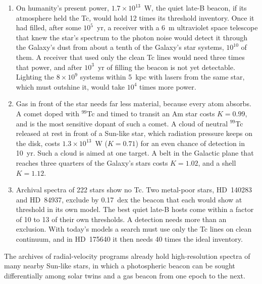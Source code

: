 \documentclass[final,5p]{elsarticle}
\begin{document}
\begin{enumerate}
\item On humanity's present power, $1.7\times10^{13}$~W, the quiet late-B beacon, if its atmosphere held the Tc, would hold 12 times its threshold inventory. Once it had filled, after some $10^{5}$~yr, a receiver with a 6~m ultraviolet space telescope that knew the star's spectrum to the photon noise would detect it through the Galaxy's dust from about a tenth of the Galaxy's star systems, $10^{10}$ of them. A receiver that used only the clean Tc lines would need three times that power, and after $10^{3}$~yr of filling the beacon is not yet detectable. Lighting the $8\times10^{9}$ systems within 5~kpc with lasers from the same star, which must outshine it, would take $10^{4}$ times more power.
\item Gas in front of the star needs far less material, because every atom absorbs. A comet doped with $^{99}$Tc and timed to transit an Am star costs $K = 0.99$, and  is the most sensitive dopant of such a comet. A cloud of neutral $^{99}$Tc released at rest in front of a Sun-like star, which radiation pressure keeps on the disk, costs $1.3\times10^{13}$~W ($K = 0.71$) for an even chance of detection in 10~yr. Such a cloud is aimed at one target. A belt in the Galactic plane that reaches three quarters of the Galaxy's stars costs $K = 1.02$, and a shell $K = 1.12$.
\item Archival spectra of 222 stars show no Tc. Two metal-poor stars, HD~140283 and HD~84937, exclude by 0.17~dex the beacon that each would show at threshold in its own model. The best quiet late-B hosts come within a factor of 10 to 13 of their own thresholds. A detection needs more than an exclusion. With today's models a search must use only the Tc lines on clean continuum, and in HD~175640 it then needs 40 times the ideal inventory.
\end{enumerate}
The archives of radial-velocity programs already hold high-resolution spectra of many nearby Sun-like stars, in which a photospheric beacon can be sought differentially among solar twins and a gas beacon from one epoch to the next.
\end{document}
